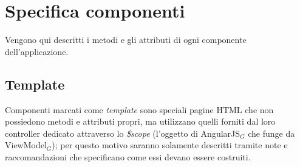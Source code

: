 \clearpage
\section{Specifica componenti}
Vengono qui descritti i metodi e gli attributi di ogni componente dell'applicazione. \\
\subsection{Template}
Componenti marcati come \textit{template} sono speciali pagine HTML che non possiedono metodi e attributi propri, ma utilizzano quelli forniti dal loro controller dedicato attraverso lo \textit{\$scope} (l'oggetto di AngularJS$_G$ che funge da ViewModel$_G$); per questo motivo saranno solamente descritti tramite note e raccomandazioni che specificano come essi devano essere costruiti.

